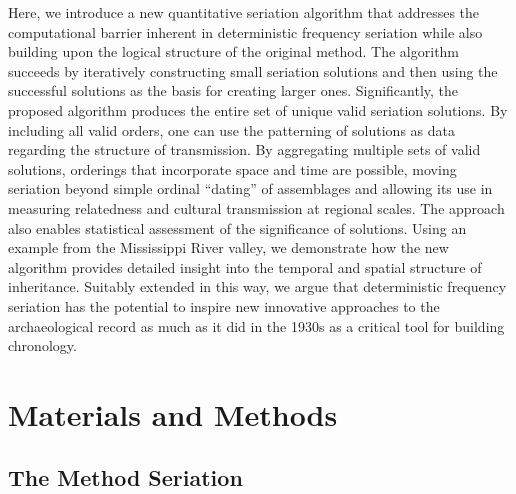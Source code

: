 \documentclass[10pt,letterpaper]{article}
\begin{document}
Here, we introduce a new quantitative seriation algorithm that addresses the computational barrier inherent in deterministic frequency seriation while also building upon the logical structure of the original method. The algorithm succeeds by iteratively constructing small seriation solutions and then using the successful solutions as the basis for creating larger ones. Significantly, the proposed algorithm produces the entire set of unique valid seriation solutions. By including all valid orders, one can use the patterning of solutions as data regarding the structure of transmission. By aggregating multiple sets of valid solutions, orderings that incorporate space and time are possible, moving seriation beyond simple ordinal ``dating'' of assemblages and allowing its use in measuring relatedness and cultural transmission at regional scales. The approach also enables statistical assessment of the significance of solutions. Using an example from the Mississippi River valley, we demonstrate how the new algorithm provides detailed insight into the temporal and spatial structure of inheritance.  Suitably extended in this way, we argue that deterministic frequency seriation has the potential to inspire new innovative approaches to the archaeological record as much as it did in the 1930s as a critical tool for building chronology.


\section*{Materials and Methods}
\subsection*{The Method Seriation}
\end{document}
